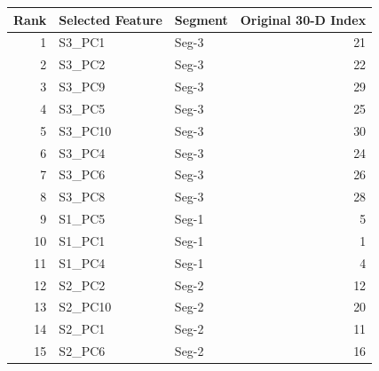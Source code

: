 \begin{tabular}{rllr}
\toprule
Rank & Selected Feature & Segment & Original 30-D Index \\
\midrule
1 & S3_PC1 & Seg-3 & 21 \\
2 & S3_PC2 & Seg-3 & 22 \\
3 & S3_PC9 & Seg-3 & 29 \\
4 & S3_PC5 & Seg-3 & 25 \\
5 & S3_PC10 & Seg-3 & 30 \\
6 & S3_PC4 & Seg-3 & 24 \\
7 & S3_PC6 & Seg-3 & 26 \\
8 & S3_PC8 & Seg-3 & 28 \\
9 & S1_PC5 & Seg-1 & 5 \\
10 & S1_PC1 & Seg-1 & 1 \\
11 & S1_PC4 & Seg-1 & 4 \\
12 & S2_PC2 & Seg-2 & 12 \\
13 & S2_PC10 & Seg-2 & 20 \\
14 & S2_PC1 & Seg-2 & 11 \\
15 & S2_PC6 & Seg-2 & 16 \\
\bottomrule
\end{tabular}

